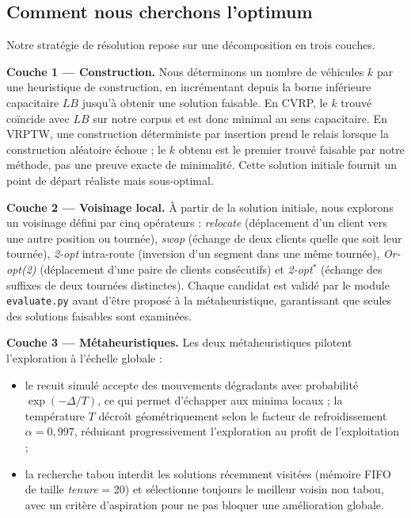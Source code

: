 \documentclass[11pt,a4paper]{article}
\begin{document}
\subsection{Comment nous cherchons l'optimum}

Notre stratégie de résolution repose sur une décomposition en trois couches.

\textbf{Couche 1 — Construction.} Nous déterminons un nombre de véhicules $k$ par une heuristique de construction, en incrémentant depuis la borne inférieure capacitaire $LB$ jusqu'à obtenir une solution faisable. En CVRP, le $k$ trouvé coïncide avec $LB$ sur notre corpus et est donc minimal au sens capacitaire. En VRPTW, une construction déterministe par insertion prend le relais lorsque la construction aléatoire échoue ; le $k$ obtenu est le premier trouvé faisable par notre méthode, pas une preuve exacte de minimalité. Cette solution initiale fournit un point de départ réaliste mais sous-optimal.

\textbf{Couche 2 — Voisinage local.} À partir de la solution initiale, nous explorons un voisinage défini par cinq opérateurs : \textit{relocate} (déplacement d'un client vers une autre position ou tournée), \textit{swap} (échange de deux clients quelle que soit leur tournée), \textit{2-opt} intra-route (inversion d'un segment dans une même tournée), \textit{Or-opt(2)} (déplacement d'une paire de clients consécutifs) et \textit{2-opt$^*$} (échange des suffixes de deux tournées distinctes). Chaque candidat est validé par le module \texttt{evaluate.py} avant d'être proposé à la métaheuristique, garantissant que seules des solutions faisables sont examinées.

\textbf{Couche 3 — Métaheuristiques.} Les deux métaheuristiques pilotent l'exploration à l'échelle globale :
\begin{itemize}
    \item le recuit simulé accepte des mouvements dégradants avec probabilité $\exp(-\Delta/T)$, ce qui permet d'échapper aux minima locaux ; la température $T$ décroît géométriquement selon le facteur de refroidissement $\alpha = 0{,}997$, réduisant progressivement l'exploration au profit de l'exploitation ;
    \item la recherche tabou interdit les solutions récemment visitées (mémoire FIFO de taille \textit{tenure} = 20) et sélectionne toujours le meilleur voisin non tabou, avec un critère d'aspiration pour ne pas bloquer une amélioration globale.
\end{itemize}
\end{document}
